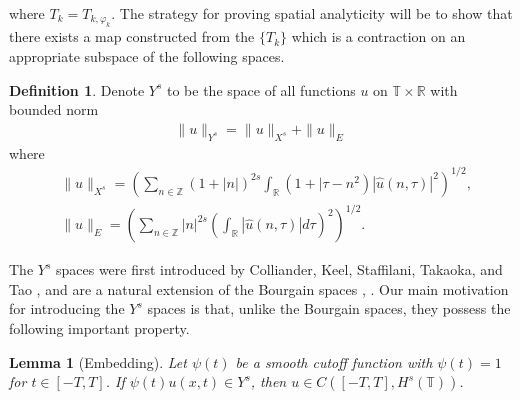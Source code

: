 \documentclass[12pt,reqno]{amsart}
\numberwithin{equation}{section}  %
\numberwithin{figure}{section}
\newcommand{\rr}{\mathbb{R}}
\newcommand{\zz}{\mathbb{Z}}
\newcommand{\ci}{\mathbb{T}}
\newcommand{\wh}{\widehat}
\newcommand{\vp}{\varphi}
\theoremstyle{plain}
\newtheorem{lemma}{Lemma}
\theoremstyle{definition}
\newtheorem{definition}{Definition}
\theoremstyle{remark}
\begin{document}
%
where $T_k = T_{k,\vp_k}$.
%
The strategy for proving spatial analyticity will be to show that there exists a
map constructed from the $\{T_k\}$ which is a
contraction on an appropriate subspace of the following spaces.
\begin{definition}
	Denote $Y^s$ to be the space of all
	functions $u$ on $\ci \times \rr$ with
	bounded norm
\begin{equation}
	\label{Y-s-norm}
	\begin{split}
    \|u\|_{Y^s} = \|u\|_{X^s} + \|u\|_E
  \end{split}
\end{equation}
%
%
%
%
where
%
\begin{equation}
	\label{X^s-norm}
	\begin{split}
		& \|u\|_{X^s}
		= \left ( \sum_{n\in \zz} \left (1 + |n| \right )^{2s} \int_\rr \left ( 1 + | 
		\tau - n^{2} \right ) | \wh{u} ( n, \tau ) |^2
		\right )^{1/2},
    \\
    & \|u\|_E = \left( \sum_{n \in \zz} | n |^{2s} \left(
    \int_{\rr} | \wh{u}(n, \tau) |d \tau
    \right)^{2} \right)^{1/2}.
	\end{split}
\end{equation}
%
%
%
\end{definition}
The $Y^s$ spaces were first introduced by Colliander, Keel, Staffilani, Takaoka,
and Tao \cite{Colliander:2003kx}, and are a natural extension of the Bourgain spaces
\cite{Bourgain-Fourier-transfo-1}, \cite{Bourgain-Fourier-transfo}. Our main
motivation for introducing the $Y^s$ spaces is that, unlike the
Bourgain spaces, they possess the
following important property.
%
%
\begin{lemma}[Embedding]
	\label{lem:cutoff-loc-soln}
	Let $\psi(t)$ be a smooth cutoff function with $\psi(t) =1$ for $t \in [-T, T]$. If
	$\psi(t)u(x,t) \in Y^s$, then $u \in C([-T, T], H^s(\ci))$.
\end{lemma}
%
%
%
%
%
%
%
%
%
%
\end{document}

